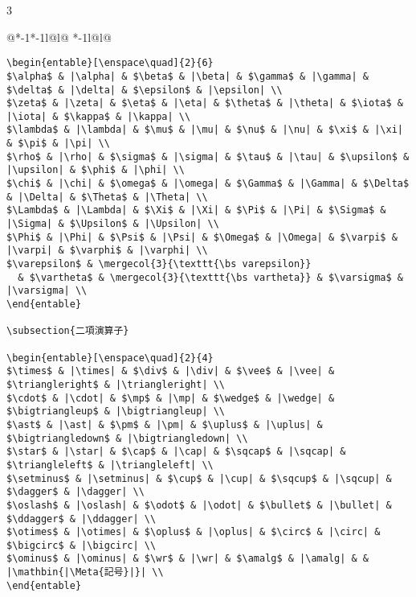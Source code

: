 \documentclass[10pt,a4paper,landscape,dvipdfmx,nomag]{jsarticle}
\makeatletter
\def\set@etsep#1#2{\def\etcolsep{#1}\def\etitemsep{#2}}
\newenvironment{entable}[3][\quad\qquad]{%
  \set@etsep#1\relax\relax
  \begin{tabular}{%
    @{}*{\the\numexpr#3-1}{*{\the\numexpr#2-1}{l@{\etcolsep}}l@{\etitemsep}}%
    *{\the\numexpr#2-1}{l@{\etcolsep}}l@{}}}{%
  \end{tabular}}
\newcommand{\mergecol}[2]{\multicolumn{#1}{@{}l@{}}{#2}}
\newcommand{\Meta}[1]{$\langle$\mbox{}\emph{#1}\mbox{}$\rangle$}
\makeatother
\begin{document}
\begin{multicols}{3}
\begin{entable}[\enspace]{2}{1}
\begin{verbatim}
\begin{entable}[\enspace\quad]{2}{6}
$\alpha$ & |\alpha| & $\beta$ & |\beta| & $\gamma$ & |\gamma| & $\delta$ & |\delta| & $\epsilon$ & |\epsilon| \\
$\zeta$ & |\zeta| & $\eta$ & |\eta| & $\theta$ & |\theta| & $\iota$ & |\iota| & $\kappa$ & |\kappa| \\
$\lambda$ & |\lambda| & $\mu$ & |\mu| & $\nu$ & |\nu| & $\xi$ & |\xi| & $\pi$ & |\pi| \\
$\rho$ & |\rho| & $\sigma$ & |\sigma| & $\tau$ & |\tau| & $\upsilon$ & |\upsilon| & $\phi$ & |\phi| \\
$\chi$ & |\chi| & $\omega$ & |\omega| & $\Gamma$ & |\Gamma| & $\Delta$ & |\Delta| & $\Theta$ & |\Theta| \\
$\Lambda$ & |\Lambda| & $\Xi$ & |\Xi| & $\Pi$ & |\Pi| & $\Sigma$ & |\Sigma| & $\Upsilon$ & |\Upsilon| \\
$\Phi$ & |\Phi| & $\Psi$ & |\Psi| & $\Omega$ & |\Omega| & $\varpi$ & |\varpi| & $\varphi$ & |\varphi| \\
$\varepsilon$ & \mergecol{3}{\texttt{\bs varepsilon}}
  & $\vartheta$ & \mergecol{3}{\texttt{\bs vartheta}} & $\varsigma$ & |\varsigma| \\
\end{entable}

\subsection{二項演算子}

\begin{entable}[\enspace\quad]{2}{4}
$\times$ & |\times| & $\div$ & |\div| & $\vee$ & |\vee| & $\triangleright$ & |\triangleright| \\
$\cdot$ & |\cdot| & $\mp$ & |\mp| & $\wedge$ & |\wedge| & $\bigtriangleup$ & |\bigtriangleup| \\
$\ast$ & |\ast| & $\pm$ & |\pm| & $\uplus$ & |\uplus| & $\bigtriangledown$ & |\bigtriangledown| \\
$\star$ & |\star| & $\cap$ & |\cap| & $\sqcap$ & |\sqcap| & $\triangleleft$ & |\triangleleft| \\
$\setminus$ & |\setminus| & $\cup$ & |\cup| & $\sqcup$ & |\sqcup| & $\dagger$ & |\dagger| \\
$\oslash$ & |\oslash| & $\odot$ & |\odot| & $\bullet$ & |\bullet| & $\ddagger$ & |\ddagger| \\
$\otimes$ & |\otimes| & $\oplus$ & |\oplus| & $\circ$ & |\circ| & $\bigcirc$ & |\bigcirc| \\
$\ominus$ & |\ominus| & $\wr$ & |\wr| & $\amalg$ & |\amalg| & & |\mathbin{|\Meta{記号}|}| \\
\end{entable}


\end{verbatim}
\end{entable}
\end{multicols}
\end{document}
